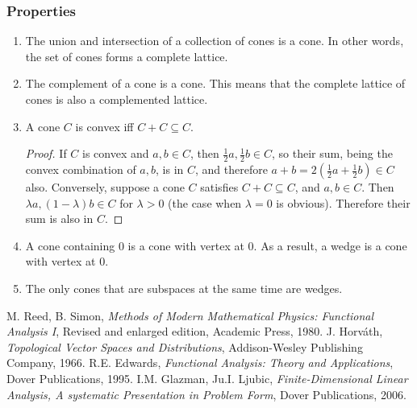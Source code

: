 \documentclass[12pt]{article}
\begin{document}
\subsubsection*{Properties}
\begin{enumerate}
\item The union and intersection of a collection of cones is a cone.  In other words, the set of cones forms a complete lattice.
\item The complement of a cone is a cone.  This means that the complete lattice of cones is also a complemented lattice. 
\item A cone $C$ is convex iff $C+C\subseteq C$.
\begin{proof}
If $C$ is convex and $a,b\in C$, then $\frac{1}{2}a,\frac{1}{2}b\in C$, so their sum, being the convex combination of $a,b$, is in $C$, and therefore $a+b=2(\frac{1}{2}a+\frac{1}{2}b)\in C$ also.  Conversely, suppose a cone $C$ satisfies $C+C\subseteq C$, and $a,b\in C$.  Then $\lambda a,(1-\lambda)b\in C$ for $\lambda> 0$ (the case when $\lambda=0$ is obvious).  Therefore their sum is also in $C$.
\end{proof}
\item A cone containing $0$ is a cone with vertex at $0$.  As a result, a wedge is a cone with vertex at $0$.
\item The only cones that are subspaces at the same time are wedges.
\end{enumerate}


\begin{thebibliography}{9}
 M. Reed, B. Simon,
\emph{Methods of Modern Mathematical Physics: Functional Analysis I},
Revised and enlarged edition, Academic Press, 1980.
 J. Horv\'ath, \emph{Topological Vector Spaces and Distributions},
Addison-Wesley Publishing Company, 1966.
 R.E. Edwards, \emph{Functional Analysis: Theory and Applications},
Dover Publications, 1995.
 I.M. Glazman, Ju.I. Ljubic, \emph{Finite-Dimensional Linear Analysis, A systematic Presentation in Problem Form},
Dover Publications, 2006.
\end{thebibliography}
\end{document}
